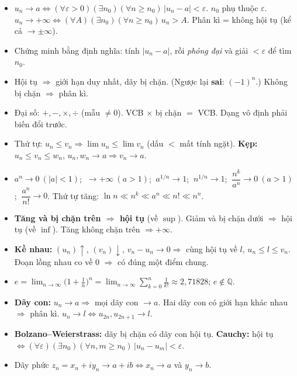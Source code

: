 \documentclass[11pt, a4paper, twoside]{article}
\newcommand{\QQ}{\mathbb{Q}}
\newcommand{\eps}{\varepsilon}
\newcommand{\limn}{\lim_{n\to\infty}}
\begin{document}
\begin{tcolorbox}[enhanced, breakable, colback=lightmain, colframe=maincolor, arc=5pt, boxrule=1.2pt,
  coltitle=white, fonttitle=\bfseries, title={TRANG GHI NHỚ BÀI 3 \enspace (chép 1 mặt vào vở)}, left=10pt, right=10pt]
\begin{itemize}[leftmargin=*, itemsep=3pt, topsep=2pt]
  \item $u_n\to a\iff(\forall\eps>0)(\exists n_0)(\forall n\ge n_0)\,|u_n-a|<\eps$. $n_0$ phụ thuộc $\eps$. $u_n\to+\infty\iff(\forall A)(\exists n_0)(\forall n\ge n_0)\,u_n>A$. Phân kì = không hội tụ (kể cả $\to\pm\infty$).
  \item Chứng minh bằng định nghĩa: tính $|u_n-a|$, rồi \emph{phóng đại} và giải $<\eps$ để tìm $n_0$.
  \item Hội tụ $\Rightarrow$ giới hạn duy nhất, dãy bị chặn. (Ngược lại \textbf{sai}: $(-1)^n$.) Không bị chặn $\Rightarrow$ phân kì.
  \item Đại số: $+,-,\times,\div$ (mẫu $\ne0$). VCB $\times$ bị chặn $=$ VCB. Dạng vô định phải biến đổi trước.
  \item Thứ tự: $u_n\le v_n\Rightarrow\lim u_n\le\lim v_n$ (dấu $<$ mất tính ngặt). \textbf{Kẹp:} $u_n\le v_n\le w_n$, $u_n,w_n\to a\Rightarrow v_n\to a$.
  \item $a^n\to0\ (|a|<1)$; $\ \to+\infty\ (a>1)$; $\ a^{1/n}\to1$; $\ n^{1/n}\to1$; $\ \dfrac{n^k}{a^n}\to0\ (a>1)$; $\ \dfrac{a^n}{n!}\to0$. Thứ tự tăng: $\ln n\ll n^k\ll a^n\ll n!\ll n^n$.
  \item \textbf{Tăng và bị chặn trên $\Rightarrow$ hội tụ} (về $\sup$). Giảm và bị chặn dưới $\Rightarrow$ hội tụ (về $\inf$). Tăng không chặn trên $\Rightarrow+\infty$.
  \item \textbf{Kề nhau:} $(u_n)\uparrow$, $(v_n)\downarrow$, $v_n-u_n\to0\Rightarrow$ cùng hội tụ về $l$, $u_n\le l\le v_n$. Đoạn lồng nhau co về $0$ $\Rightarrow$ có đúng một điểm chung.
  \item $e=\limn\big(1+\frac1n\big)^n=\limn\sum_{k=0}^n\frac1{k!}\approx2{,}71828$; $e\notin\QQ$.
  \item \textbf{Dãy con:} $u_n\to a\Rightarrow$ mọi dãy con $\to a$. Hai dãy con có giới hạn khác nhau $\Rightarrow$ phân kì. $u_n\to l\iff u_{2n},u_{2n+1}\to l$.
  \item \textbf{Bolzano--Weierstrass:} dãy bị chặn có dãy con hội tụ. \textbf{Cauchy:} hội tụ $\iff(\forall\eps)(\exists n_0)(\forall n,m\ge n_0)\,|u_n-u_m|<\eps$.
  \item Dãy phức $z_n=x_n+iy_n\to a+ib\iff x_n\to a$ và $y_n\to b$.
\end{itemize}
\end{tcolorbox}
\end{document}
